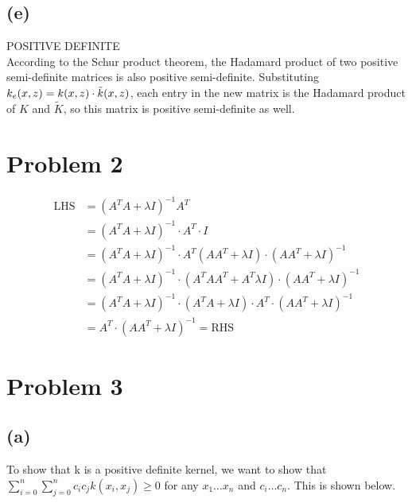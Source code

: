 \documentclass[11pt]{article}
\begin{document}
\subsection*{(e)}
POSITIVE DEFINITE\\
According to the Schur product theorem, the Hadamard product of two positive semi-definite matrices is also positive semi-definite. Substituting $k_e(x,z) = k(x,z) \cdot \Tilde{k}(x,z)$, each entry in the new matrix is the Hadamard product of $K$ and $\widetilde{K}$, so this matrix is positive semi-definite as well.


\section*{Problem 2}
\begin{equation}
    \begin{split}
        \text{LHS} & =(A^TA+\lambda I)^{-1}A^T \\
        &= (A^TA+\lambda I)^{-1} \cdot A^T \cdot I \\
        &= (A^TA+\lambda I)^{-1} \cdot A^T (AA^T + \lambda I) \cdot (AA^T + \lambda I)^{-1} \\
        &= (A^TA+\lambda I)^{-1} \cdot (A^TAA^T + A^T\lambda I) \cdot (AA^T + \lambda I)^{-1} \\
        &= (A^TA+\lambda I)^{-1} \cdot (A^TA + \lambda I) \cdot A^T \cdot (AA^T + \lambda I)^{-1} \\
        &= A^T \cdot (AA^T + \lambda I)^{-1} = \text{RHS}
    \end{split}
\end{equation}

\section*{Problem 3}
\subsection*{(a)}
To show that k is a positive definite kernel, we want to show that $\sum_{i=0}^n \sum_{j=0}^n c_i c_j k(x_i, x_j)\geq 0$ for any $x_1\ldots x_n$ and $c_i \ldots c_n$. This is shown below. \\
\end{document}
